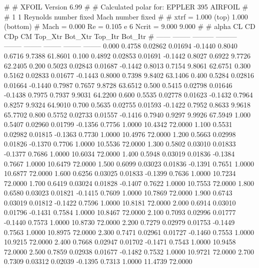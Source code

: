 #  
#       XFOIL         Version 6.99
#  
# Calculated polar for: EPPLER 395 AIRFOIL                              
#  
# 1 1 Reynolds number fixed          Mach number fixed         
#  
# xtrf =   1.000 (top)        1.000 (bottom)  
# Mach =   0.000     Re =     0.105 e 6     Ncrit =   9.000  9.000
#  
#   alpha    CL        CD       CDp       CM     Top_Xtr  Bot_Xtr  Top_Itr  Bot_Itr
#  ------ -------- --------- --------- -------- -------- -------- -------- --------
   0.000   0.4758   0.02862   0.01694  -0.1440   0.8040   0.6716   9.7388  61.8601
   0.100   0.4892   0.02853   0.01691  -0.1442   0.8027   0.6922   9.7726  62.2405
   0.200   0.5023   0.02843   0.01687  -0.1442   0.8013   0.7154   9.8061  62.6751
   0.300   0.5162   0.02833   0.01677  -0.1443   0.8000   0.7398   9.8402  63.1406
   0.400   0.5284   0.02816   0.01664  -0.1440   0.7987   0.7657   9.8728  63.6512
   0.500   0.5415   0.02798   0.01646  -0.1438   0.7975   0.7937   9.9031  64.2200
   0.600   0.5535   0.02778   0.01623  -0.1432   0.7964   0.8257   9.9324  64.9010
   0.700   0.5635   0.02755   0.01593  -0.1422   0.7952   0.8633   9.9618  65.7702
   0.800   0.5752   0.02733   0.01557  -0.1416   0.7940   0.9297   9.9926  67.5949
   1.000   0.5407   0.02960   0.01799  -0.1356   0.7756   1.0000  10.4342  72.0000
   1.100   0.5531   0.02982   0.01815  -0.1363   0.7730   1.0000  10.4976  72.0000
   1.200   0.5663   0.02998   0.01826  -0.1370   0.7706   1.0000  10.5536  72.0000
   1.300   0.5802   0.03010   0.01833  -0.1377   0.7686   1.0000  10.6034  72.0000
   1.400   0.5948   0.03019   0.01836  -0.1384   0.7667   1.0000  10.6479  72.0000
   1.500   0.6099   0.03023   0.01836  -0.1391   0.7651   1.0000  10.6877  72.0000
   1.600   0.6256   0.03025   0.01833  -0.1399   0.7636   1.0000  10.7234  72.0000
   1.700   0.6419   0.03024   0.01828  -0.1407   0.7622   1.0000  10.7553  72.0000
   1.800   0.6580   0.03023   0.01821  -0.1415   0.7609   1.0000  10.7869  72.0000
   1.900   0.6743   0.03019   0.01812  -0.1422   0.7596   1.0000  10.8181  72.0000
   2.000   0.6914   0.03010   0.01796  -0.1431   0.7584   1.0000  10.8467  72.0000
   2.100   0.7093   0.02996   0.01777  -0.1440   0.7573   1.0000  10.8730  72.0000
   2.200   0.7279   0.02979   0.01753  -0.1449   0.7563   1.0000  10.8975  72.0000
   2.300   0.7471   0.02961   0.01727  -0.1460   0.7553   1.0000  10.9215  72.0000
   2.400   0.7668   0.02947   0.01702  -0.1471   0.7543   1.0000  10.9458  72.0000
   2.500   0.7859   0.02938   0.01677  -0.1482   0.7532   1.0000  10.9721  72.0000
   2.700   0.7309   0.03312   0.02039  -0.1395   0.7313   1.0000  11.4739  72.0000
